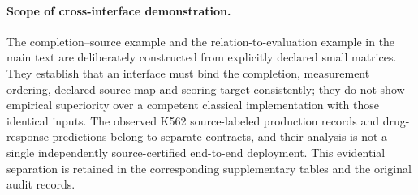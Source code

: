 \documentclass[11pt]{article}
\begin{document}
\paragraph{Scope of cross-interface demonstration.}
The completion--source example and the relation-to-evaluation example in the main text are deliberately constructed from explicitly declared small matrices. They establish that an interface must bind the completion, measurement ordering, declared source map and scoring target consistently; they do not show empirical superiority over a competent classical implementation with those identical inputs. The observed K562 source-labeled production records and drug-response predictions belong to separate contracts, and their analysis is not a single independently source-certified end-to-end deployment. This evidential separation is retained in the corresponding supplementary tables and the original audit records.
\end{document}

